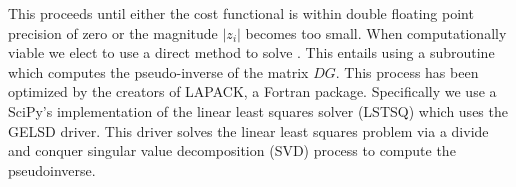 This proceeds until either the cost functional is within double floating
point precision of zero or the magnitude $|z_i|$ becomes too small.
When computationally viable we elect to use a direct method to solve
. This entails using a subroutine
which computes the pseudo-inverse of the matrix $DG$. This process
has been optimized by the creators of LAPACK, a Fortran package.
Specifically we use a SciPy's implementation of the linear least
squares solver (LSTSQ) which uses the GELSD driver. This driver solves
the linear least squares problem via a divide and conquer
singular value decomposition (SVD) process to compute
the pseudoinverse.
